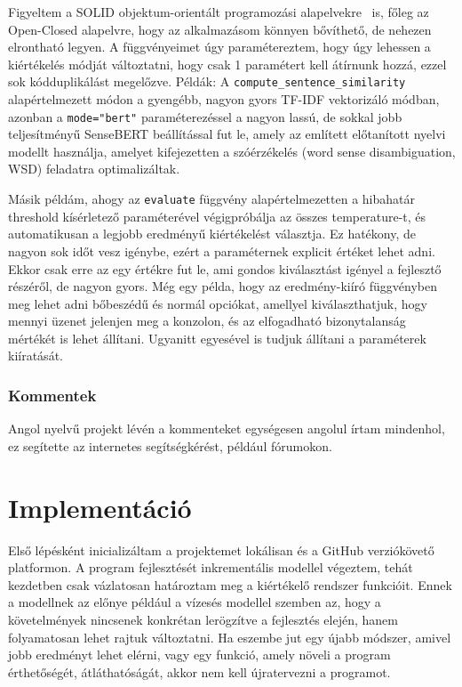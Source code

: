\documentclass[12pt]{report}
\theoremstyle{definition}
\begin{document}
Figyeltem a SOLID objektum-orientált programozási alapelvekre~\cite{oloruntoba2024solid} is, főleg az Open-Closed alapelvre, hogy az alkalmazásom könnyen bővíthető, de nehezen elrontható legyen. A függvényeimet úgy paramétereztem, hogy úgy lehessen a kiértékelés módját változtatni, hogy csak 1 paramétert kell átírnunk hozzá, ezzel sok kódduplikálást megelőzve. Példák:
A \texttt{compute\_sentence\_similarity} alapértelmezett módon a gyengébb, nagyon gyors TF-IDF vektorizáló módban, azonban a \texttt{mode="bert"} paraméterezéssel a nagyon lassú, de sokkal jobb teljesítményű SenseBERT beállítással fut le, amely az említett előtanított nyelvi modellt használja, amelyet kifejezetten a szóérzékelés (word sense disambiguation, WSD) feladatra optimalizáltak.

Másik példám, ahogy az \texttt{evaluate} függvény alapértelmezetten a hibahatár threshold kísérletező paraméterével végigpróbálja az összes temperature-t, és automatikusan a legjobb eredményű kiértékelést választja. Ez hatékony, de nagyon sok időt vesz igénybe, ezért a paraméternek explicit értéket lehet adni. Ekkor csak erre az egy értékre fut le, ami gondos kiválasztást igényel a fejlesztő részéről, de nagyon gyors.
Még egy példa, hogy az eredmény-kiíró függvényben meg lehet adni bőbeszédű és normál opciókat, amellyel kiválaszthatjuk, hogy mennyi üzenet jelenjen meg a konzolon, és az elfogadható bizonytalanság mértékét is lehet állítani. Ugyanitt egyesével is tudjuk állítani a paraméterek kiíratását.

\subsubsection{Kommentek}
Angol nyelvű projekt lévén a kommenteket egységesen angolul írtam mindenhol, ez segítette az internetes segítségkérést, például fórumokon.

\vspace*{1cm}

\section{Implementáció}
Első lépésként inicializáltam a projektemet lokálisan és a GitHub verziókövető platformon. A program fejlesztését inkrementális modellel végeztem, tehát kezdetben csak vázlatosan határoztam meg a kiértékelő rendszer funkcióit. Ennek a modellnek az előnye például a vízesés modellel szemben az, hogy a követelmények nincsenek konkrétan lerögzítve a fejlesztés elején, hanem folyamatosan lehet rajtuk változtatni. Ha eszembe jut egy újabb módszer, amivel jobb eredményt lehet elérni, vagy egy funkció, amely növeli a program érthetőségét, átláthatóságát, akkor nem kell újratervezni a programot.
\end{document}
